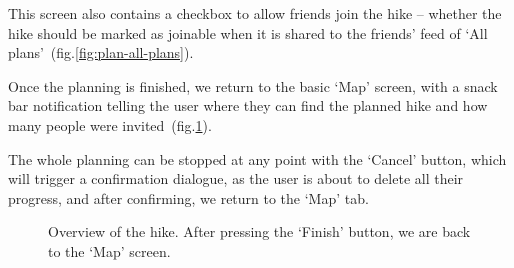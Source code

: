 This screen also contains a checkbox to allow friends join the hike -- whether the hike should be marked as joinable when it is shared to the friends' feed of `All plans'~(fig.\ref{fig:plan-all-plans}).

Once the planning is finished, we return to the basic `Map' screen, with a snack bar notification telling the user where they can find the planned hike and how many people were invited~(fig.\ref{fig:plan-end}).

The whole planning can be stopped at any point with the `Cancel' button, which will trigger a confirmation dialogue, as the user is about to delete all their progress, and after confirming, we return to the `Map' tab.

\begin{figure}[h!]
    \centering
    \hfill
    \hfill
    \caption{Overview of the hike. After pressing the `Finish' button, we are back to the `Map' screen.}
    \label{fig:plan-end}
\end{figure}

